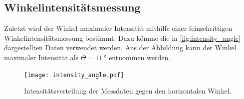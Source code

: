 \subsection{Winkelintensitätsmessung}
Zuletzt wird der Winkel maximaler Intensität mithilfe einer feinschrittigen Winkelintensitätsmessung bestimmt. 
Dazu könnne die in \autoref{fig:intensity_angle} dargestellten Daten verwendet werden. Aus der Abbildung kann der Winkel maximaler Intensität 
als $\Theta = \qty{11}{\degree}$ entnommen werden.
\begin{figure}
  \centering
  \texttt{[image: intensity\_angle.pdf]}
  \caption{Intensitätsverteilung der Messdaten gegen den horizontalen Winkel.}
  \label{fig:intensity_angle}
\end{figure}
